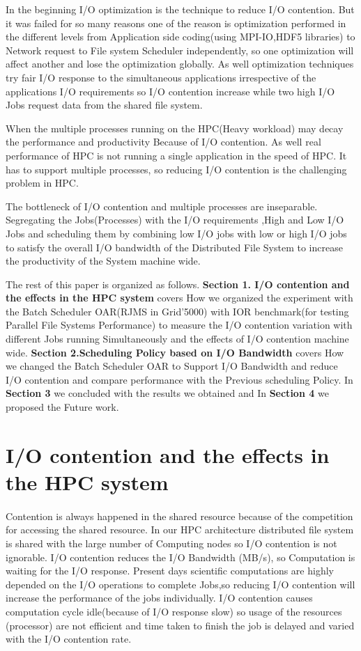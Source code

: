 \documentclass{article}
\begin{document}
In the beginning I/O optimization is the technique to reduce I/O contention. But it was failed  for so many reasons one of the reason is optimization performed in the different levels from Application side coding(using MPI-IO,HDF5 libraries) to Network request to File system Scheduler independently, so one optimization will affect another and lose the optimization globally. As well optimization techniques try fair I/O response to the simultaneous applications irrespective of the applications I/O requirements so I/O contention increase while two high I/O Jobs request data from the shared file system.


When the multiple processes running on the HPC(Heavy workload) may decay the performance and productivity Because of I/O contention. As well real performance of HPC is not running a single application in the speed of HPC. It has to support multiple processes, so reducing I/O contention is the challenging problem in HPC.


The bottleneck of I/O contention and multiple processes are inseparable. Segregating the Jobs(Processes) with the I/O requirements ,High and Low I/O Jobs and scheduling them by combining low I/O jobs with low or high I/O jobs to satisfy the overall I/O bandwidth of the Distributed File System to increase the productivity of the System machine wide.


The rest of this paper is organized as follows. \textbf{Section 1. I/O contention and the effects in the HPC system} covers How we organized the experiment with the Batch Scheduler OAR(RJMS in Grid’5000) with IOR benchmark(for testing Parallel File Systems Performance) to measure the I/O contention variation with different Jobs running Simultaneously and the effects of I/O contention machine wide. \textbf{ Section 2.Scheduling Policy based on I/O Bandwidth } covers How we changed the Batch Scheduler OAR to Support I/O Bandwidth and reduce I/O contention and compare performance with the Previous scheduling  Policy. In \textbf{Section 3} we concluded with the results we obtained and In \textbf{Section 4 }we proposed the Future work.
\section{I/O contention and the effects in the HPC system}
\paragraph{}Contention is always happened in the shared resource because of the competition for accessing the shared resource. In our HPC architecture distributed file system is shared with the large number of Computing nodes so I/O contention is not ignorable. I/O contention reduces the I/O Bandwidth (MB/s), so Computation is waiting for the I/O response. Present days scientific computations are highly depended on the I/O operations to complete Jobs,so reducing I/O contention will increase the performance of the jobs individually. I/O contention causes computation cycle idle(because of I/O response slow) so usage of the resources (processor) are not efficient and time taken to finish the job is delayed and varied with the I/O contention rate.
\end{document}
